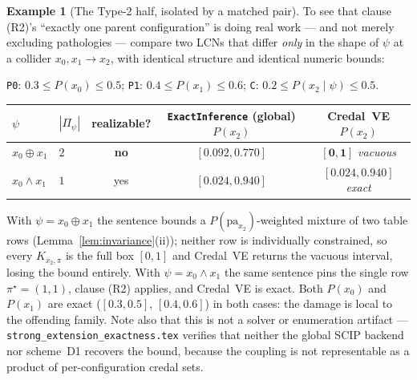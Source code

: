 \documentclass[11pt]{article}
\theoremstyle{definition}
\newtheorem{example}{Example}
\newcommand{\pa}{\mathrm{pa}}
\begin{document}
\begin{example}[The Type-2 half, isolated by a matched pair]\label{ex:collider}
To see that clause (R2)'s ``exactly one parent configuration'' is doing real work --- and not merely
excluding pathologies --- compare two LCNs that differ \emph{only} in the shape of $\psi$ at a
collider $x_0,x_1\to x_2$, with identical structure and identical numeric bounds:
\begin{center}\small
\texttt{P0}: $0.3\le P(x_0)\le0.5$;\quad
\texttt{P1}: $0.4\le P(x_1)\le0.6$;\quad
\texttt{C}: $0.2\le P(x_2\mid\psi)\le0.5$.
\end{center}
\begin{center}\small
\begin{tabular}{@{}llccc@{}}
\toprule
$\psi$ & $|\Pi_\psi|$ & realizable? & \texttt{ExactInference} (global) $P(x_2)$ & Credal~VE $P(x_2)$\\
\midrule
$x_0\oplus x_1$   & $2$ & \textbf{no}  & $[0.092,0.770]$ & $\mathbf{[0,1]}$ \emph{vacuous} \\
$x_0\wedge x_1$   & $1$ & yes          & $[0.024,0.940]$ & $\mathbf{[0.024,0.940]}$ \emph{exact} \\
\bottomrule
\end{tabular}
\end{center}
With $\psi=x_0\oplus x_1$ the sentence bounds a $P(\pa_{x_2})$-weighted mixture of two table rows
(Lemma~\ref{lem:invariance}(ii)); neither row is individually constrained, so every
$K_{x_2,\pi}$ is the full box $[0,1]$ and Credal~VE returns the vacuous interval, losing the bound
entirely. With $\psi=x_0\wedge x_1$ the same sentence pins the single row $\pi^\star=(1,1)$, clause
(R2) applies, and Credal~VE is exact. Both $P(x_0)$ and $P(x_1)$ are exact ($[0.3,0.5]$,
$[0.4,0.6]$) in both cases: the damage is local to the offending family. Note also that this is not
a solver or enumeration artifact --- \texttt{strong\_extension\_exactness.tex} verifies that neither
the global SCIP backend nor scheme~D1 recovers the bound, because the coupling is not representable
as a product of per-configuration credal sets.
\end{example}
\end{document}

